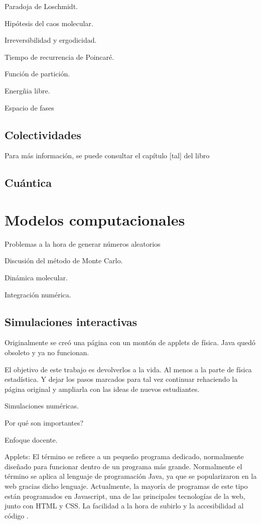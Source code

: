 \documentclass[11pt, a4paper]{article} %
\theoremstyle{named}
\begin{document}
Paradoja de Loschmidt.

Hipótesis del caos molecular.

Irreversibilidad y ergodicidad.

Tiempo de recurrencia de Poincaré.

Función de partición.

Energñia libre.

Espacio de fases

\subsection{Colectividades}

\cite{salcido}

Para más información, se puede consultar el capítulo [tal] del libro \cite{}

\subsection{Cuántica}

\section{Modelos computacionales}

Problemas a la hora de generar números aleatorios

Discusión del método de Monte Carlo.

Dinámica molecular.

Integración numérica.

\subsection{Simulaciones interactivas}
\label{sec:sims}

Originalmente se creó una página con un montón de applets de física. Java quedó obsoleto y ya no funcionan.

El objetivo de este trabajo es devolverlos a la vida. Al menos a la parte de física estadística. Y dejar los pasos marcados para tal vez continuar rehaciendo la página original y ampliarla con las ideas de nuevos estudiantes.

Simulaciones numéricas.

Por qué son importantes?

Enfoque docente.

Applets: El término se refiere a un pequeño programa dedicado, normalmente diseñado para funcionar dentro de un programa más grande. Normalmente el término se aplica al lenguaje de programación Java, ya que se popularizaron en la web gracias dicho lenguaje.  Actualmente, la mayoría de programas de este tipo están programados en Javascript, una de las principales tecnologías de la web, junto con HTML y CSS. La facilidad a la hora de subirlo y la accesibilidad al código \cite{schroeder}.
\end{document}
